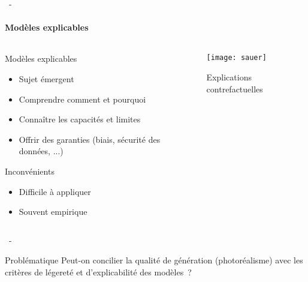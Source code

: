 \documentclass[aspectratio=169, 22pt]{beamer}
\begin{document}
\begin{frame}{\secname~- \subsecname}
  \framesubtitle{Modèles explicables}
  \begin{columns}
    \begin{column}{0.5\linewidth}
      \begin{block}{Modèles explicables}        
        \begin{itemize}
        \item \small Sujet émergent
        \item \small Comprendre comment et pourquoi 
        \item \small Connaître les capacités et limites
        \item \small Offrir des garanties (biais, sécurité des données, ...)
        \end{itemize}
      \end{block}
      \begin{alertblock}{Inconvénients}
        \begin{itemize}
        \item \small Difficile à appliquer
        \item \small Souvent empirique
        \end{itemize}
      \end{alertblock}
    \end{column}
    \begin{column}{0.5\linewidth}
      \begin{figure}
        \centering
        \texttt{[image: sauer]}
        \caption{{Explications contrefactuelles \newline [Sauer et al., 2021]}}
      \end{figure}
    \end{column}
  \end{columns}    
\end{frame}

\begin{frame}{\secname~- \subsecname}
  \begin{customblock}{\centering Problématique}
    \centering
    Peut-on concilier la qualité de génération (photoréalisme) avec
    les critères de légereté et d'explicabilité des modèles ?
  \end{customblock}
\end{frame}
\end{document}
